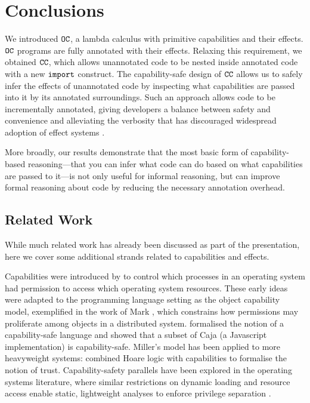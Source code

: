 \section{Conclusions}

We introduced $\mathtt{OC}$, a lambda calculus with primitive capabilities and their effects. $\mathtt{OC}$ programs are fully annotated with their effects. Relaxing this requirement, we obtained $\mathtt{CC}$, which allows unannotated code to be nested inside annotated code with a new $\mathtt{import}$ construct. The capability-safe design of $\mathtt{CC}$ allows us to safely infer the effects of unannotated code by inspecting what capabilities are passed into it by its annotated surroundings. Such an approach allows code to be incrementally annotated, giving developers a balance between safety and convenience and alleviating the verbosity that has discouraged widespread adoption of effect systems \cite{rytz12}.

More broadly, our results demonstrate that the most basic form of capability-based reasoning---that you can infer what code can do based on what capabilities are passed to it---is not only useful for informal reasoning, but can improve formal reasoning about code by reducing the necessary annotation overhead.

\subsection{Related Work}

While much related work has already been discussed as part of the presentation, here we cover some additional strands related to capabilities and effects.

Capabilities were introduced by \citet{dennis66} to control which processes in an operating system had permission to access which operating system resources.
These early ideas were adapted to the programming language setting as the object capability model, exemplified in the work of Mark \citet{miller06}, which constrains how permissions may proliferate among objects in a distributed system.
\citet{maffeis10} formalised the notion of a capability-safe language and showed that a subset of Caja (a Javascript implementation) is capability-safe.
Miller's model has been applied to more heavyweight systems: \citet{drossopoulou07} combined Hoare logic with capabilities to formalise the notion of trust. Capability-safety parallels have been explored in the operating systems literature, where similar restrictions on dynamic loading and resource access \cite{hunt07} enable static, lightweight analyses to enforce privilege separation \cite{madhavapeddy13}.

